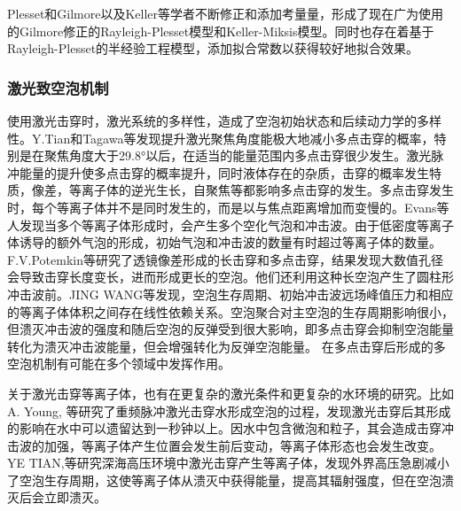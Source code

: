Plesset和Gilmore以及Keller等学者不断修正和添加考量量，形成了现在广为使用的Gilmore修正的Rayleigh-Plesset模型和Keller-Miksis模型\cite{Gilmore1952,plesset_collapse_1971,keller_bubble_1980,vogel_cavitation_1986,lauterborn_experimental_1975}。同时也存在着基于Rayleigh-Plesset的半经验工程模型，添加拟合常数以获得较好地拟合效果\cite{zhong_model_2020,e8c740d030b19350fce6133360d2ed165a59bd78,supponen_shock_2017,supponen_collapse_2017,obreschkow_analytical_2012,welch_pulsed_2010,selmke_bubble_2020,lohse_bubble_2018,long_early_2020}。
\bigskip
\medskip
\subsubsection{激光致空泡机制}

使用激光击穿时，激光系统的多样性，造成了空泡初始状态和后续动力学的多样性。Y.Tian和Tagawa等发现提升激光聚焦角度能极大地减小多点击穿的概率，特别是在聚焦角度大于29.8°以后，在适当的能量范围内多点击穿很少发生\cite{tian_stabilization_2016,5cc135338ea245a01dafd12d44f183533dca487e,tagawa_pressure_2016}。激光脉冲能量的提升使多点击穿的概率提升\cite{kennedy_laser-induced_1997}，同时液体存在的杂质\cite{3d66d01b44fd4e7e6a8da70ed5dd2de9fca0dfac}，击穿的概率发生特质\cite{kennedy_laser-induced_1997}，像差\cite{evans_lens_1969,2b9cbf597962b6d717ea63693143471a76669358}，等离子体的逆光生长\cite{docchio_study_1988}，自聚焦\cite{potemkin_highly_2015,evans_pump-probe_2010}等都影响多点击穿的发生。多点击穿发生时，每个等离子体并不是同时发生的，而是以与焦点距离增加而变慢的\cite{docchio_study_1988, capon_nd_1988}。Evans等人\cite{evans_pump-probe_2010}发现当多个等离子体形成时，会产生多个空化气泡和冲击波。由于低密度等离子体诱导的额外气泡的形成，初始气泡和冲击波的数量有时超过等离子体的数量\cite{5a91d410705767266bdb87527d785a319238fdbf}。F.V.Potemkin等研究了透镜像差形成的长击穿和多点击穿，结果发现大数值孔径会导致击穿长度变长，进而形成更长的空泡\cite{potemkin_dynamics_nodate}。他们还利用这种长空泡产生了圆柱形冲击波前\cite{potemkin_laser_2014}。JING WANG等发现，空泡生存周期、初始冲击波远场峰值压力和相应的等离子体体积之间存在线性依赖关系\cite{fu_experimental_2018}。空泡聚合对主空泡的生存周期影响很小，但溃灭冲击波的强度和随后空泡的反弹受到很大影响，即多点击穿会抑制空泡能量转化为溃灭冲击波能量，但会增强转化为反弹空泡能量。
在多点击穿后形成的多空泡机制有可能在多个领域中发挥作用\cite{peters_highly_2013}。

关于激光击穿等离子体，也有在更复杂的激光条件和更复杂的水环境的研究。比如A. Young, 等研究了重频脉冲激光击穿水形成空泡的过程，发现激光击穿后其形成的影响在水中可以遗留达到一秒钟以上。因水中包含微泡和粒子，其会造成击穿冲击波的加强，等离子体产生位置会发生前后变动，等离子体形态也会发生改变\cite{young_laser-induced_2021}。YE TIAN,等研究深海高压环境中激光击穿产生等离子体，发现外界高压急剧减小了空泡生存周期，这使等离子体从溃灭中获得能量，提高其辐射强度，但在空泡溃灭后会立即溃灭\cite{tian_laser-induced_2020}。

